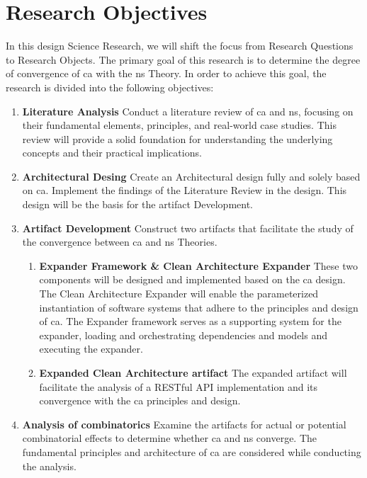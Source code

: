 \section{Research Objectives} \label{sec_research_objectives}

In this design Science Research, we will shift the focus from Research Questions to
Research Objects. The primary goal of this research is to determine the degree of
convergence of \gls{ca} with the \gls{ns} Theory. In order to achieve this goal, the
research is divided into the following objectives:

\begin{enumerate}
    \item \textbf{Literature Analysis} \newline
    Conduct a literature review of \gls{ca} and \gls{ns}, focusing on their
    fundamental elements, principles, and real-world case studies. This review will
    provide a solid foundation for understanding the underlying concepts and their
    practical implications.
    
    \item \textbf{Architectural Desing} \newline
    Create an Architectural design fully and solely based on \gls{ca}. Implement the
    findings of the Literature Review in the design. This design will be the basis for
    the artifact Development.

    \item \textbf{Artifact Development} \newline
    Construct two artifacts that facilitate the study of the convergence between  \gls{ca}
    and \gls{ns} Theories.
    \begin{enumerate}[label*={\arabic*.}]
        
        \item \textbf{Expander Framework \& Clean Architecture Expander} \newline        
        These two components will be designed and implemented  based on the \gls{ca}
        design. The Clean Architecture Expander will enable the parameterized
        instantiation of software systems that adhere to the principles and design of
        \gls{ca}. The Expander framework serves as a supporting system for the expander,
        loading and orchestrating dependencies and models and executing the expander.
        
        \item \textbf{Expanded Clean Architecture artifact} \newline
        The expanded artifact will facilitate the analysis of a RESTful API implementation
        and its convergence with the \gls{ca} principles and design.
        
    \end{enumerate}
    
    \item \textbf{Analysis of combinatorics} \newline
    Examine the artifacts for actual or potential combinatorial effects to determine
    whether \gls{ca} and \gls{ns} converge. The fundamental principles and architecture of
    \gls{ca} are considered while conducting the analysis.
\end{enumerate}